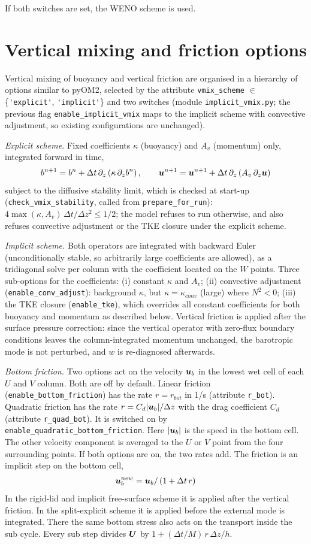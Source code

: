 \documentclass[12pt]{article}
\newcommand{\beq}  { \begin{eqnarray} }
\newcommand{\eeq}  { \end{eqnarray}}
\newcommand{\beeq}  { \begin{eqnarray*} }
\newcommand{\eeeq}  { \end{eqnarray*}}
\renewcommand{\v}[1]{{\mbox{\boldmath$ #1 $}}}  %
\newcommand{\pz}[1]{{\partial_z #1}}
\newcommand{\lk}{\left(}
\newcommand{\rk}{\right)}
\begin{document}
If both switches are set, the WENO scheme is used.
  

\section*{Vertical mixing and friction options}

Vertical mixing of buoyancy and vertical friction are organised in a
hierarchy of options similar to pyOM2, selected by the attribute
\verb|vmix_scheme| $\in$ \{\verb|'explicit'|, \verb|'implicit'|\} and two
switches (module \verb|implicit_vmix.py|; the previous flag
\verb|enable_implicit_vmix| maps to the implicit scheme with convective
adjustment, so existing configurations are unchanged).

\emph{Explicit scheme.} Fixed coefficients $\kappa$ (buoyancy) and $A_v$
(momentum) only, integrated forward in time,
\beq
 b^{n+1} = b^n + \Delta t\, \pz{} \lk \kappa\, \pz b^n \rk, \qquad
 \v u^{n+1} = \v u^{n+1} + \Delta t\, \pz{} \lk A_v\, \pz{\v u} \rk
\eeq
subject to the diffusive stability limit, which is checked at start-up
(\verb|check_vmix_stability|, called from \verb|prepare_for_run|):
$ 4 \max(\kappa, A_v)\, \Delta t / \Delta z^2 \le 1/2$; the model refuses to
run otherwise, and also refuses convective adjustment or the TKE closure
under the explicit scheme.

\emph{Implicit scheme.} Both operators are integrated with backward Euler
(unconditionally stable, so arbitrarily large coefficients are allowed),
as a tridiagonal solve per column with the coefficient located on the
$W$ points. Three sub-options for the coefficients:
(i) constant $\kappa$ and $A_v$;
(ii) convective adjustment (\verb|enable_conv_adjust|): background
$\kappa$, but $\kappa = \kappa_{conv}$ (large) where $N^2 < 0$;
(iii) the TKE closure (\verb|enable_tke|), which overrides all constant
coefficients for both buoyancy and momentum as described below.
Vertical friction is applied after the surface pressure correction: since
the vertical operator with zero-flux boundary conditions leaves the
column-integrated momentum unchanged, the barotropic mode is not
perturbed, and $w$ is re-diagnosed afterwards.

\emph{Bottom friction.} Two options act on the velocity $\v u_b$ in the lowest wet cell
of each $U$ and $V$ column. Both are off by default.
Linear friction (\verb|enable_bottom_friction|) has the rate $r = r_{bot}$ in 1/s
(attribute \verb|r_bot|).
Quadratic friction has the rate
$r = C_d |\v u_b| / \Delta z$ with the drag coefficient $C_d$ (attribute \verb|r_quad_bot|).
It is switched on by
\verb|enable_quadratic_bottom_friction|.
Here $|\v u_b|$ is the speed in the bottom cell. The other velocity component is averaged
to the $U$ or $V$ point from the four surrounding points.
If both options are on, the two rates add.
The friction is an implicit step on the bottom cell,
\beeq
 \v u_b^{new} = \v u_b / \lk 1 + \Delta t\, r \rk
\eeeq
In the rigid-lid and implicit free-surface scheme it is applied after the vertical friction.
In the split-explicit scheme it is applied before the external mode is integrated.
There the same bottom stress also acts on the transport inside the sub cycle.
Every sub step divides $\v U$ by $1 + (\Delta t/M)\, r\, \Delta z / h$.
\end{document}
